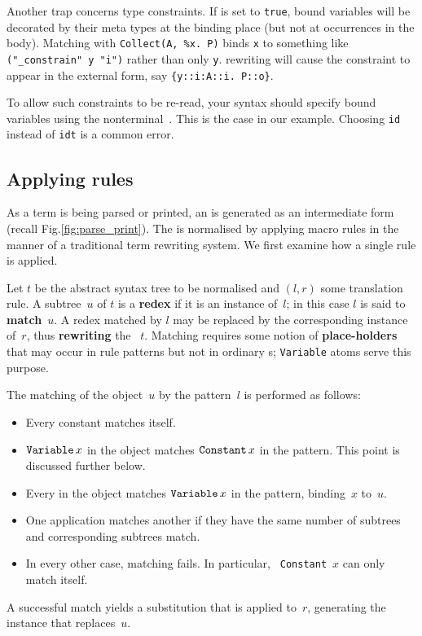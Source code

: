 \begin{warn}
Another trap concerns type constraints.  If  is set to
{\tt true}, bound variables will be decorated by their meta types at the
binding place (but not at occurrences in the body).  Matching with
\verb|Collect(A, %x. P)| binds {\tt x} to something like {\tt ("_constrain" y
"i")} rather than only {\tt y}.  \AST{} rewriting will cause the constraint to
appear in the external form, say \verb|{y::i:A::i. P::o}|.

To allow such constraints to be re-read, your syntax should specify bound
variables using the nonterminal~.  This is the case in our
example.  Choosing {\tt id} instead of {\tt idt} is a common error.
\end{warn}



\subsection{Applying rules}
As a term is being parsed or printed, an \AST{} is generated as an
intermediate form (recall Fig.\ts\ref{fig:parse_print}).  The \AST{} is
normalised by applying macro rules in the manner of a traditional term
rewriting system.  We first examine how a single rule is applied.

Let $t$ be the abstract syntax tree to be normalised and $(l, r)$ some
translation rule.  A subtree~$u$ of $t$ is a {\bf redex} if it is an
instance of~$l$; in this case $l$ is said to {\bf match}~$u$.  A redex
matched by $l$ may be replaced by the corresponding instance of~$r$, thus
{\bf rewriting} the \AST~$t$.  Matching requires some notion of {\bf
  place-holders} that may occur in rule patterns but not in ordinary
\AST{}s; {\tt Variable} atoms serve this purpose.

The matching of the object~$u$ by the pattern~$l$ is performed as follows:
\begin{itemize}
  \item Every constant matches itself.

  \item $\mathop{\mbox{\tt Variable}}\nolimits x$ in the object matches $\mathop{\mbox{\tt Constant}}\nolimits x$ in the pattern.
    This point is discussed further below.

  \item Every \AST{} in the object matches $\mathop{\mbox{\tt Variable}}\nolimits x$ in the pattern,
    binding~$x$ to~$u$.

  \item One application matches another if they have the same number of
    subtrees and corresponding subtrees match.

  \item In every other case, matching fails.  In particular, {\tt
      Constant}~$x$ can only match itself.
\end{itemize}
A successful match yields a substitution that is applied to~$r$, generating
the instance that replaces~$u$.

